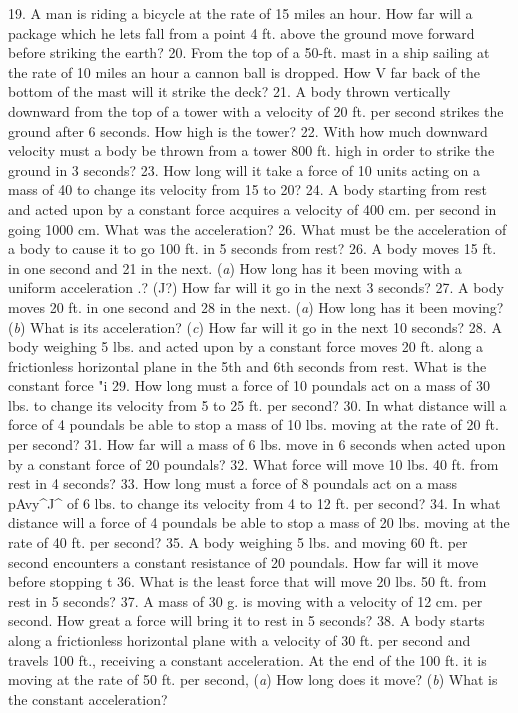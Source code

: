 19. A man is riding a bicycle at the rate of 15 miles an hour. How far will a package which he lets fall from a point 4 ft. above the ground move forward before striking the earth?
20. From the top of a 50-ft. mast in a ship sailing at the rate of 10 miles an hour a cannon ball is dropped. How V far back of the bottom of the mast will it strike the deck?
21. A body thrown vertically downward from the top of a tower with a velocity of 20 ft. per second strikes the ground after 6 seconds. How high is the tower?
22. With how much downward velocity must a body be thrown from a tower 800 ft. high in order to strike the ground in 3 seconds?
23. How long will it take a force of 10 units acting on a mass of 40 to change its velocity from 15 to 20?
24. A body starting from rest and acted upon by a constant force acquires a velocity of 400 cm. per second in going 1000 cm. What was the acceleration?
26. What must be the acceleration of a body to cause it to go 100 ft. in 5 seconds from rest?
26. A body moves 15 ft. in one second and 21 in the next. (\emph{a}) How long has it been moving with a uniform acceleration .? (J?) How far will it go in the next 3 seconds?
27. A body moves 20 ft. in one second and 28 in the next. (\emph{a}) How long has it been moving? (\emph{b}) What is its acceleration? (\emph{c}) How far will it go in the next 10 seconds?
28. A body weighing 5 lbs. and acted upon by a constant force moves 20 ft. along a frictionless horizontal plane in the 5th and 6th seconds from rest. What is the constant force "i
29. How long must a force of 10 poundals act on a mass of 30 lbs. to change its velocity from 5 to 25 ft. per second?
30. In what distance will a force of 4 poundals be able to stop a mass of 10 lbs. moving at the rate of 20 ft. per second?
31. How far will a mass of 6 lbs. move in 6 seconds when acted upon by a constant force of 20 poundals?
32. What force will move 10 lbs. 40 ft. from rest in 4 seconds?
33. How long must a force of 8 poundals act on a mass pAvy^J^ of 6 lbs. to change its velocity from 4 to 12 ft. per second?
34. In what distance will a force of 4 poundals be able to stop a mass of 20 lbs. moving at the rate of 40 ft. per second?
35. A body weighing 5 lbs. and moving 60 ft. per second encounters a constant resistance of 20 poundals. How far will it move before stopping t
36. What is the least force that will move 20 lbs. 50 ft. from rest in 5 seconds?
37. A mass of 30 g. is moving with a velocity of 12 cm. per second. How great a force will bring it to rest in 5 seconds?
38. A body starts along a frictionless horizontal plane with a velocity of 30 ft. per second and travels 100 ft., receiving a constant acceleration. At the end of the 100 ft. it is moving at the rate of 50 ft. per second, (\emph{a}) How long does it move? (\emph{b}) What is the constant acceleration?
